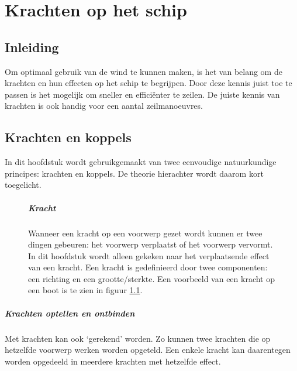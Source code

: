 \chapter{Krachten op het schip}
\section{Inleiding}

Om optimaal gebruik van de wind te kunnen maken, is het van belang om de krachten en hun effecten op het schip te begrijpen. Door deze kennis juist toe te passen is het mogelijk om sneller en efficiënter te zeilen. De juiste kennis van krachten is ook handig voor een aantal zeilmanoeuvres. 

\section{Krachten en koppels}
\label{par:krachten_uitleg}
In dit hoofdstuk wordt gebruikgemaakt van twee eenvoudige natuurkundige principes: krachten en koppels. De theorie hierachter wordt daarom kort toegelicht.

\begin{figure}[H]
	\centering
	\begin{minipage}[t]{0.75\textwidth}
		\paragraph{Kracht}
		Wanneer een kracht op een voorwerp gezet wordt kunnen er twee dingen gebeuren: het voorwerp verplaatst of het voorwerp vervormt. In dit hoofdstuk wordt alleen gekeken naar het verplaatsende effect van een kracht. Een kracht is gedefinieerd door twee componenten: een richting en een grootte/sterkte. Een voorbeeld van een kracht op een boot is te zien in figuur  \ref{pic:kracht}. 
	\end{minipage}
	\hfill
	\begin{minipage}[t]{0.22\textwidth}
		\RemoveLine
		\caption{}
		\label{pic:kracht}
	\end{minipage}
\end{figure} 

\paragraph{Krachten optellen en ontbinden}
Met krachten kan ook `gerekend' worden. Zo kunnen twee krachten die op hetzelfde voorwerp werken worden opgeteld. Een enkele kracht kan daarentegen worden opgedeeld in meerdere krachten met hetzelfde effect.

